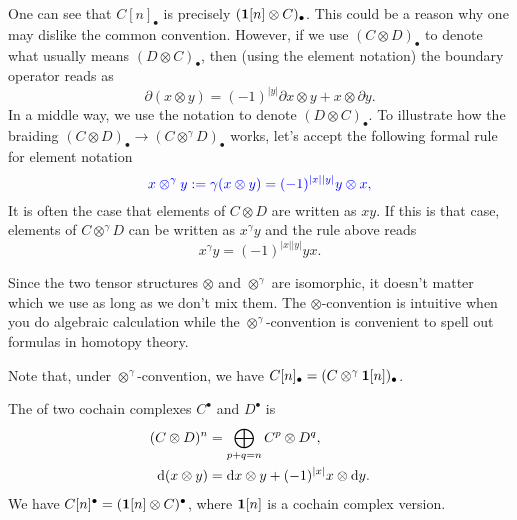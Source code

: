 \begin{Rem}
One can see that $C[n]_{\bullet}$ 
is precisely $(\mathbf{1}[n]\otimes C)_{\bullet}$.
This could be a reason why one may dislike the common convention. 
However, if we use $(C\otimes D)_{\bullet}$ 
to denote what usually means $(D\otimes C)_{\bullet}$, 
then (using the element notation) the boundary operator reads as 
\[
\partial(x\otimes y) = 
(-1)^{|y|}\partial x\otimes y + x\otimes\partial y.
\]
In a middle way, we use the notation 
to denote $(D\otimes C)_{\bullet}$.
To illustrate how the braiding 
$(C\otimes D)_{\bullet}\to (C\otimes^{\gamma}D)_{\bullet}$ 
works, let's accept the following formal rule for element notation
\[
\color{blue}
x\otimes^{\gamma}y:=\gamma(x\otimes y)=(-1)^{|x||y|}y\otimes x,
\]
It is often the case that elements of $C\otimes D$ are written as $xy$. 
If this is that case, elements of $C\otimes^{\gamma}D$ can be 
written as $x^{\gamma}y$ and the rule above reads 
\[
x^{\gamma}y=(-1)^{|x||y|}yx.
\]

Since the two tensor structures 
$\otimes$ and $\otimes^{\gamma}$ are isomorphic, 
it doesn't matter which we use as long as we don't mix them.
The $\otimes$-convention is intuitive when 
you do algebraic calculation while the 
$\otimes^{\gamma}$-convention is convenient 
to spell out formulas in homotopy theory.

Note that, under $\otimes^{\gamma}$-convention, 
we have $C[n]_{\bullet}=(C\otimes^{\gamma}\mathbf{1}[n])_{\bullet}$.
\end{Rem}
\begin{Rem}
The  of two cochain complexes
$C^{\bullet}$ and $D^{\bullet}$ is 
\begin{align*}
(C\otimes D)^n &=\bigoplus_{p+q=n}C^p\otimes D^q,\\
\mathrm{d}(x\otimes y) &= \mathrm{d} x\otimes y + (-1)^{|x|}x\otimes\mathrm{d} y.
\end{align*}
We have $C[n]^{\bullet} = (\mathbf{1}[n]\otimes C)^{\bullet}$, 
where $\mathbf{1}[n]$ is a cochain complex version.
\end{Rem}

